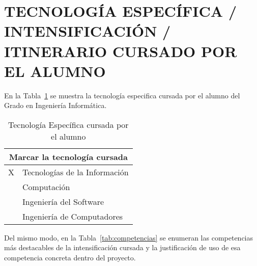 \documentclass{pre-tfg}
\begin{document}
\newpage

\section{TECNOLOGÍA ESPECÍFICA / INTENSIFICACIÓN / ITINERARIO CURSADO POR EL ALUMNO}

En la Tabla~\ref{tab:tec-especifica} se muestra la tecnología especifica cursada por el alumno del
Grado en Ingeniería Informática.

\begin{table}[hp]
  \centering
  \caption{Tecnología Específica cursada por el alumno}
  \label{tab:tec-especifica}

  \begin{tabular}{l p{}}
    \multicolumn{2}{c}{\textbf{Marcar la tecnología cursada}} \\
    \hline
    X & Tecnologías de la Información \\
    ~ & Computación                   \\
    ~ & Ingeniería del Software       \\
    ~ & Ingeniería de Computadores    \\ \hline
  \end{tabular}
\end{table}

Del mismo modo, en la Tabla~\ref{tab:competencias} se enumeran las competencias más destacables de
la intensificación cursada y la justificación de uso de esa competencia concreta dentro del
proyecto.
\end{document}
